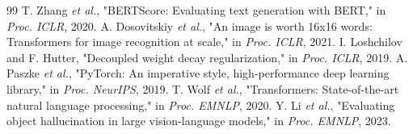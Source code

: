 \documentclass[journal,twoside,web]{ieeecolor}
\begin{document}
\begin{thebibliography}{99}
 T. Zhang \textit{et al.}, "BERTScore: Evaluating text generation with BERT," in \textit{Proc. ICLR}, 2020.
 A. Dosovitskiy \textit{et al.}, "An image is worth 16x16 words: Transformers for image recognition at scale," in \textit{Proc. ICLR}, 2021.
 I. Loshchilov and F. Hutter, "Decoupled weight decay regularization," in \textit{Proc. ICLR}, 2019.
 A. Paszke \textit{et al.}, "PyTorch: An imperative style, high-performance deep learning library," in \textit{Proc. NeurIPS}, 2019.
 T. Wolf \textit{et al.}, "Transformers: State-of-the-art natural language processing," in \textit{Proc. EMNLP}, 2020.
 Y. Li \textit{et al.}, "Evaluating object hallucination in large vision-language models," in \textit{Proc. EMNLP}, 2023.
\end{thebibliography}
\end{document}
